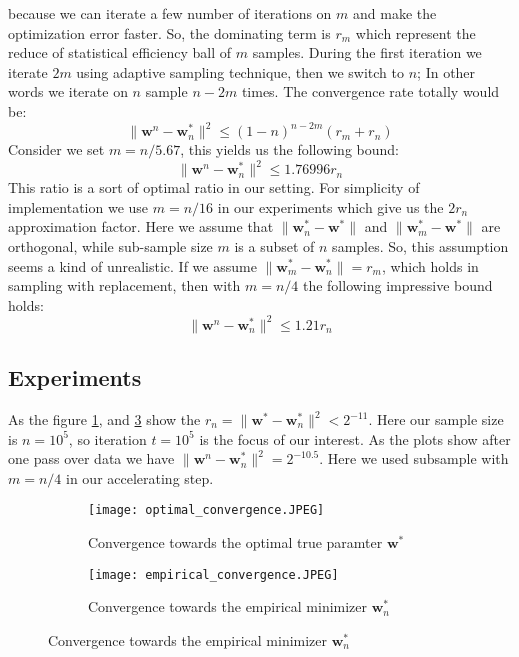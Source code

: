 \documentclass[11pt, a4paper, reqno, twoside]{scrartcl}
\theoremstyle{style}
\newcommand{\wv}{\bm{w}}
\newcommand{\0}{\mathbf{0}} %
\begin{document}
because we can iterate a few number of iterations on $m$ and make the
optimization error faster. So, the dominating term is $r_m$ which
represent the reduce of statistical efficiency ball of $m$ samples.
During the first iteration we iterate $2m$ using adaptive sampling technique, then we switch to $n$; In other words we iterate on
$n$ sample $n-2m$ times. The convergence rate totally would be: 
\begin{equation}
	\| \wv^n - \wv_n^* \|^2 \leq (1-n)^{n-2m} (r_m + r_n) \label{eqn:ball_tradeoff}
\end{equation}
Consider we set $m = n/5.67$, this yields us the following bound: 
\begin{equation*}
	\| \wv^n - \wv_n^* \|^2 \leq 1.76996 r_n
\end{equation*}
This ratio is a sort of optimal ratio in our setting. For simplicity of
implementation we use $m = n/16$ in our experiments which give us the $2 r_n$
approximation factor. Here we assume that $\| \wv^*_n - \wv^* \|$ and $\|\wv^*_m
- \wv^* \|$ are orthogonal, while sub-sample size $m$ is a subset of $n$
samples. So, this assumption seems a kind of unrealistic. If we assume 
$\| \wv_m^* - \wv_n^*\| = r_m$, which holds in sampling with replacement, then
with $m=n/4$ the following impressive bound holds: 
\begin{equation*}
	\| \wv^n - \wv^*_{n} \|^2 \leq 1.21 r_n
\end{equation*}
\subsection{Experiments}
As the figure \ref{fig:optimal_convergence}, and \ref{fig:empirical_convergence}
show the $r_n = \| \wv^* - \wv_n^* \|^2 < 2^{-11}$. Here our sample size is $n
= 10^5$, so iteration $t = 10^5$ is the focus of our interest. As the plots show
after one pass over data we have $\|\wv^n - \wv^*_n\|^2 = 2^{-10.5}$. Here we
used subsample with $m=n/4$ in our accelerating step. 
\begin{figure}
\begin{subfigure}{.5\textwidth}
\center
\texttt{[image: optimal\_convergence.JPEG]} 
\caption{Convergence towards the optimal true paramter $\wv^*$}
\label{fig:optimal_convergence}
\end{subfigure}
\begin{subfigure}{.5\textwidth}
\center
\texttt{[image: empirical\_convergence.JPEG]} 
\caption{Convergence towards the empirical minimizer $\wv_n^*$}
\label{fig:empirical_convergence}
\end{subfigure}
\end{figure}
\end{document}
